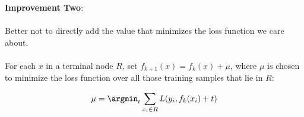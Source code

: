 %
\begin{frame}
\textbf{Improvement Two}:\\~\\

Better not to directly add the value that minimizes the loss function we care about.\\~\\

For each $x$ in a terminal node $R$, set $f_{k+1}(x) = f_k(x) + \mu$, where $\mu$ is chosen to minimize the loss function over all those training samples that lie in $R$:

$$ \mu = \argmin_t \sum_{x_i \in R} L(y_i, f_k(x_i) + t) $$
\end{frame} 

